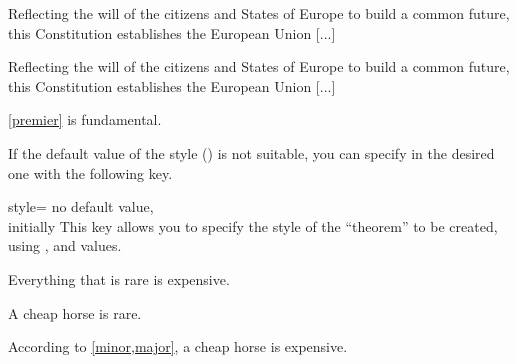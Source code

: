 \documentclass[english,nolocaltoc]{nwejmart}
\newtheorem{article}
\newtheorem[style=definition]{fact}
\newtheorem[title=experience]{experience}
\newtheorem[title-plural=rings]{ring}
\newtheorem[title=ideal,title-plural=ideals]{ideal}
\begin{document}
\begin{bodycode}[listing and text,listing options={deletekeywords={[2]article,label}}]
\begin{article*}
Reflecting the will of the citizens and States of Europe to build a
common future, this Constitution establishes the European Union  [...]
\end{article*}
\begin{article}\label{premier}
Reflecting the will of the citizens and States of Europe to build a
common future, this Constitution establishes the European Union  [...] 
\end{article}
\vref{premier} is fundamental.
\end{bodycode}

 If the  default value of the style () is not
 suitable, you can specify in  the desired one with
 the following   key.
  \begin{docKey}{style}{=\textbar{}\textbar{}}{
      no default value,\\initially {}}
    This key allows you to specify the style of the \enquote{theorem}
    to be created, using ,  and
     values.
  \end{docKey}
\begin{bodycode}[listing and text,listing options={deletekeywords={[2]label}}]
\begin{fact}\label{major}
Everything that is rare is expensive.
\end{fact}
\begin{fact}\label{minor}
A cheap horse is rare.
\end{fact}
According to  \cref{minor,major},  a cheap horse is expensive.
\end{bodycode}
\end{document}
